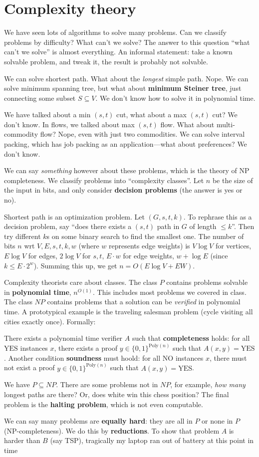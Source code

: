 \section{Complexity theory} 
We have seen lots of algorithms to solve many problems. Can we classify problems by difficulty? What can't we solve? The answer to this question ``what can't we solve'' is almost everything. An informal statement: take a known solvable problem, and tweak it, the result is probably not solvable.
\begin{example}
    We can solve shortest path. What about the \emph{longest} simple path. Nope. We can solve minimum spanning tree, but what about \textbf{minimum Steiner tree}, just connecting some subset $S \subseteq V$. We don't know how to solve it in polynomial time. 

    We have talked about a min $(s,t)$ cut, what about a max $(s,t)$ cut? We don't know. In flows, we talked about max $(s,t)$ flow. What about multi-commodity flow? Nope, even with just two commodities. We can solve interval packing, which has job packing as an application---what about preferences? We don't know.
\end{example}
We can say \emph{something} however about these problems, which is the theory of NP completeness. We classify problems into ``complexity classes''. Let $n$ be the size of the input in bits, and only consider \textbf{decision problems}  (the answer is yes or no).
\begin{example}
    Shortest path is an optimization problem. Let $(G,s,t,k)$. To rephrase this as a decision problem, say ``does there exists a $(s,t)$ path in $G$ of length $\leq k$''. Then try different $k$s on some binary search to find the smallest one. The number of bits $n$ wrt $V,E,s,t,k,w$ (where  $w$ represents edge weights) is $V \log V$ for vertices, $E \log V$ for edges, $2 \log V$ for $s,t$,  $E\cdot w$ for edge weights, $w + \log E$ (since $k \leq E \cdot 2^w$). Summing this up, we get $n=O(E \log V+E W)$.
\end{example}
Complexity theorists care about classes. The class $P$ contains problems solvable in \textbf{polynomial time}, $n ^{O(1)}$. This includes most problems we covered in class. The class $NP$ contains problems that a solution can be \emph{verified} in polynomial time. A prototypical example is the traveling salesman problem (cycle visiting all cities exactly once). Formally:
\begin{definition}[NP]
    There exists a polynomial time verifier $A$ such that \textbf{completeness}  holds: for all $\mathrm{YES}$ instances $x$, there exists a proof $y \in  \{0,1\} ^{\mathrm{Poly}(n)}$ such that $A(x,y)=\mathrm{YES}$. Another condition \textbf{soundness} must hoold: for all $\mathrm{NO}$ instances $x$, there must not exist a proof $y \in \{0,1\} ^{\mathrm{Poly}(n)}$ such that $A(x,y)=\mathrm{YES}$.
\end{definition}
We have $P \subseteq NP$. There are some problems not in $NP$, for example, \emph{how many} longest paths are there? Or, does white win this chess position? The final problem is the \textbf{halting problem}, which is not even computable.


We can say many problems are \textbf{equally hard}: they are all in $P$ or none in $P$ (NP-completeness). We do this by \textbf{reductions}. To show that problem $A$ is harder than $B$ (say TSP), {\color{red}tragically my laptop ran out of battery at this point in time} 
